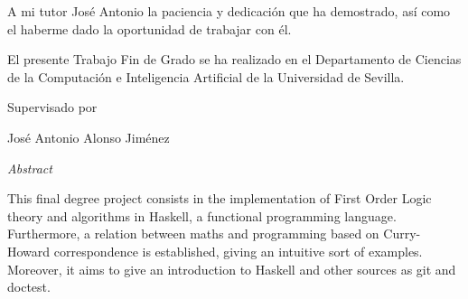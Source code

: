 \documentclass[a4paper,12pt,twoside]{book}
\begin{document}
\begin{titlepage}
\begin{flushright}
\begin{minipage}{8.45cm}
      A mi tutor José Antonio la paciencia y dedicación
      que ha demostrado, así como el haberme dado la
      oportunidad de trabajar con él.
      \end{minipage}

      \vspace*{7.5mm}

  \end{flushright}
  \vspace*{\fill}

  \newpage


  
  \begin{center}
   \vspace*{5cm}
    \begin{minipage}{14cm}
      El presente Trabajo Fin de Grado se ha realizado en el Departamento de Ciencias de la Computación e Inteligencia Artificial de la Universidad de Sevilla.

      \vspace*{7.5mm}

      Supervisado por
    \end{minipage}\par
    José Antonio Alonso Jiménez
    \end{center}
  \vspace*{\fill}

  \newpage

  \vspace*{3cm}
  {\huge \textit{Abstract}}

  \vspace{2cm}
  This final degree project consists in the implementation of First Order Logic theory and algorithms
  in Haskell, a functional programming language. Furthermore, a relation between maths
  and programming based on Curry-Howard correspondence is established, giving an intuitive sort of examples.
  Moreover, it aims to give an introduction to Haskell and other sources as git and doctest.

  
\end{titlepage}
\newpage


\newpage 

\tableofcontents
\newpage





% 








\end{document}
